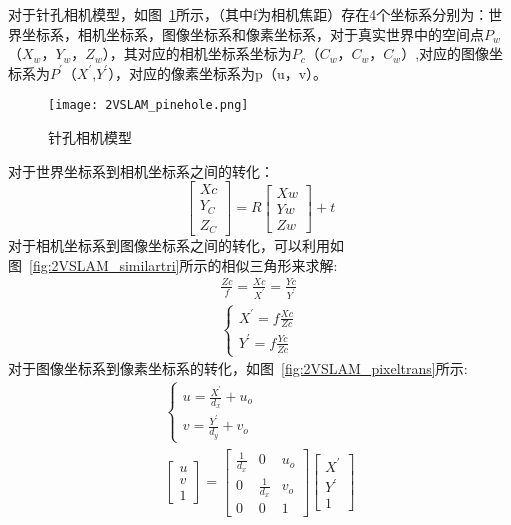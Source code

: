对于针孔相机模型，如图~\ref{fig:2VSLAM_pinehole}所示，（其中f为相机焦距）存在4个坐标系分别为：世界坐标系，相机坐标系，图像坐标系和像素坐标系，对于真实世界中的空间点$P_w$（$X_w$，$Y_w$，$Z_w$），其对应的相机坐标系坐标为$P_c$（$C_w$，$C_w$，$C_w$）,对应的图像坐标系为$P^{'}$（$X^{'}$,$Y^{'}$），对应的像素坐标系为p（u，v）。
\begin{figure}[H]
  \centering
  \texttt{[image: 2VSLAM\_pinehole.png]}
  \caption{针孔相机模型}
  \label{fig:2VSLAM_pinehole}
\end{figure}
对于世界坐标系到相机坐标系之间的转化：
\begin{equation}
  \left[\begin{array}{l}{X c} \\ {Y_{C}} \\ {Z_{C}}\end{array}\right]=R\left[\begin{array}{l}{X w} \\ {Y w} \\ {Z w}\end{array}\right]+t
  \label{equ:world2cam}
\end{equation}
对于相机坐标系到图像坐标系之间的转化，可以利用如图~\ref{fig:2VSLAM_similartri}所示的相似三角形来求解:
\begin{equation}
  \begin{split}
    \frac{Z c}{f}=\frac{X c}{X^{'}}=\frac{Y c}{Y^{'}}\\
    \left\{\begin{array}{l}{X^{\prime}=f \frac{X c}{Z c}} \\ {Y^{\prime}=f \frac{Y c}{Z c}}\end{array}\right.
\end{split}
\label{equ:cam2photo}
\end{equation}
对于图像坐标系到像素坐标系的转化，如图~\ref{fig:2VSLAM_pixeltrans}所示:
\begin{equation}
  \begin{split}
    \left\{\begin{array}{l}{u=\frac{X^{\prime}}{d_{x}}+u_{o}} \\ {v=\frac{Y^{\prime}}{d_{y}}+v_{o}}\end{array}\right.\\
    \left[\begin{array}{l}{u} \\ {v} \\ {1}\end{array}\right]=\left[\begin{array}{ccc}{\frac{1}{d_{x}}} & {0} & {u_{o}} \\ {0} & {\frac{1}{d_{x}}} & {v_{o}} \\ {0} & {0} & {1}\end{array}\right]\left[\begin{array}{c}{X^{\prime}} \\ {Y^{\prime}} \\ {1}\end{array}\right]
  \end{split}
  \label{equ:photo2pixel}
\end{equation}
